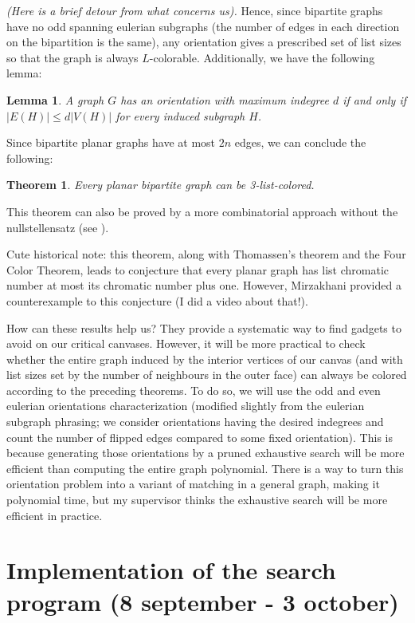 \documentclass{article}
\newtheorem{theorem}{Theorem}
\newtheorem{lemma}{Lemma}
\begin{document}
\textit{(Here is a brief detour from what concerns us).} Hence, since bipartite graphs have no odd spanning eulerian subgraphs (the number of edges in each direction on the bipartition is the same), any orientation gives a prescribed set of list sizes so that the graph is always $L$-colorable. Additionally, we have the following lemma:

\begin{lemma}
A graph $G$ has an orientation with maximum indegree $d$ if and only if $|E(H)| \leq d|V(H)|$ for every induced subgraph $H$.
\end{lemma}

Since bipartite planar graphs have at most $2n$ edges, we can conclude the following:

\begin{theorem}
Every planar bipartite graph can be 3-list-colored.
\end{theorem}

This theorem can also be proved by a more combinatorial approach without the nullstellensatz (see \cite{dvoraknullstellensatz}). 

Cute historical note: this theorem, along with Thomassen's theorem and the Four Color Theorem, leads to conjecture that every planar graph has list chromatic number at most its chromatic number plus one. However, Mirzakhani provided a counterexample to this conjecture (I did a video about that!).

How can these results help us? They provide a systematic way to find gadgets to avoid on our critical canvases. However, it will be more practical to check whether the entire graph induced by the interior vertices of our canvas (and with list sizes set by the number of neighbours in the outer face) can always be colored according to the preceding theorems. To do so, we will use the odd and even eulerian orientations characterization (modified slightly from the eulerian subgraph phrasing; we consider orientations having the desired indegrees and count the number of flipped edges compared to some fixed orientation). This is because generating those orientations by a pruned exhaustive search will be more efficient than computing the entire graph polynomial. There is a way to turn this orientation problem into a variant of matching in a general graph, making it polynomial time, but my supervisor thinks the exhaustive search will be more efficient in practice. 

\section{Implementation of the search program (8 september - 3 october)}
\end{document}
